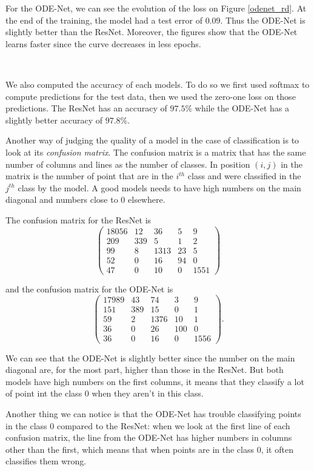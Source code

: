 \documentclass[10pt,a4paper]{article}
\theoremstyle{definition}
\theoremstyle{plain}
\begin{document}
For the ODE-Net, we can see the evolution of the loss on Figure \ref{odenet_rd}. At the end of the training, the model had a test error of $0.09$. Thus the ODE-Net is slightly better than the ResNet. Moreover, the figures show that the ODE-Net learns faster since the curve decreases in less epochs.

~

We also computed the accuracy of each models. To do so we first used softmax to compute predictions for the test data, then we used the zero-one loss on those predictions. The ResNet has an accuracy of $97.5\%$ while the ODE-Net has a slightly better accuracy of $97.8\%$.

Another way of judging the quality of a model in the case of classification is to look at its \textit{confusion matrix}. The confusion matrix is a matrix that has the same number of columns and lines as the number of classes. In position $(i,j)$ in the matrix is the number of point that are in the $i^{th}$ class and were classified in the $j^{th}$ class by the model. A good models needs to have high numbers on the main diagonal and numbers close to $0$ elsewhere.

The confusion matrix for the ResNet is
$$
\begin{pmatrix}
18056 & 12 & 36 & 5 & 9 \\
209 & 339 & 5 & 1 & 2 \\
99 & 8 & 1313 & 23 & 5 \\
52 & 0 & 16 & 94 & 0 \\
47 & 0 & 10 & 0 & 1551
\end{pmatrix}
$$

and the confusion matrix for the ODE-Net is
$$
\begin{pmatrix}
17989 & 43 & 74 & 3 & 9 \\
151 & 389 & 15 & 0 & 1 \\
59 & 2 & 1376 & 10 & 1 \\
36 & 0 & 26 & 100 & 0 \\
36 & 0 & 16 & 0 & 1556
\end{pmatrix}.
$$

We can see that the ODE-Net is slightly better since the number on the main diagonal are, for the most part, higher than those in the ResNet. But both models have high numbers on the first columns, it means that they classify a lot of point int the class $0$ when they aren't in this class.

Another thing we can notice is that the ODE-Net has trouble classifying points in the class $0$ compared to the ResNet: when we look at the first line of each confusion matrix, the line from the ODE-Net has higher numbers in columns other than the first, which means that when points are in the class $0$, it often classifies them wrong.
\end{document}
